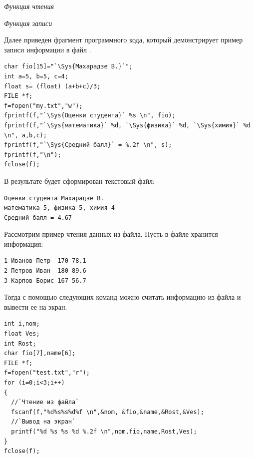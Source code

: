 \emph{Функция чтения}


\emph{Функция записи}


Далее приведен фрагмент программного кода, который демонстрирует пример записи информации в файл
.
\begin{lstlisting}
char fio[15]="`\Sys{Махарадзе В.}`";
int a=5, b=5, c=4;
float s= (float) (a+b+c)/3;
FILE *f;
f=fopen("my.txt","w");
fprintf(f,"`\Sys{Оценки студента}` %s \n", fio);
fprintf(f,"`\Sys{математика}` %d, `\Sys{физика}` %d, `\Sys{химия}` %d \n", a,b,c);
fprintf(f,"`\Sys{Средний балл}` = %.2f \n", s);
fprintf(f,"\n");
fclose(f);
\end{lstlisting}

В результате будет сформирован текстовый файл:
\begin{verbatim}
Оценки студента Махарадзе В.
математика 5, физика 5, химия 4
Средний балл = 4.67
\end{verbatim}

Рассмотрим пример чтения данных из файла. Пусть в файле  хранится информация:
\begin{verbatim}
1 Иванов Петр  170 78.1
2 Петров Иван  180 89.6
3 Карпов Борис 167 56.7
\end{verbatim}

Тогда с помощью следующих команд можно считать информацию из файла и вывести ее на экран.
\begin{lstlisting}
int i,nom;
float Ves;
int Rost;
char fio[7],name[6];
FILE *f;	
f=fopen("test.txt","r");
for (i=0;i<3;i++)
{
  //`Чтение из файла`
  fscanf(f,"%d%s%s%d%f \n",&nom, &fio,&name,&Rost,&Ves);
  //`Вывод на экран`
  printf("%d %s %s %d %.2f \n",nom,fio,name,Rost,Ves);
}
fclose(f);
\end{lstlisting}

